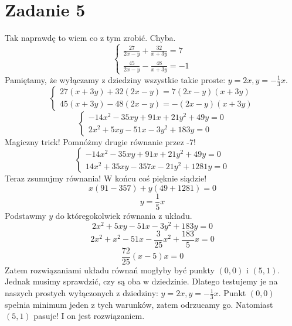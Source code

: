 \documentclass [a4paper, 10pt]{article}
\begin{document}
\section*{Zadanie 5}
Tak naprawdę to wiem co z tym zrobić. Chyba.\\
$$\begin{cases} {\frac{27}{2x-y} + \frac{32}{x+3y} = 7}\\{\frac{45}{2x-y} - \frac{48}{x+3y} = -1}\end{cases}$$
Pamiętamy, że wyłączamy z dziedziny wszystkie takie proste: $y = 2x, y = -\frac13x$.
$$\begin{cases} 27(x+3y) + 32(2x-y) = 7(2x-y)(x+3y)\\45(x+3y) - 48(2x-y) = -(2x-y)(x+3y)\end{cases}$$
$$\begin{cases} -14 x^2-35 x y+91 x+21 y^2+49 y = 0\\2x^2 + 5xy - 51x -3y^2+183y = 0\end{cases}$$
Magiczny trick! Pomnóżmy drugie równanie przez -7!
$$\begin{cases} -14 x^2-35 x y+91 x+21 y^2+49 y = 0\\14 x^2+35 x y-357 x-21 y^2+1281 y = 0\end{cases}$$
Teraz zsumujmy równania! W końcu coś pięknie siądzie!
$$x(91-357) + y(49+1281) = 0$$
$$y = \frac15x$$
Podstawmy $y$ do któregokolwiek równania z układu.
$$2x^2 + 5xy - 51x -3y^2+183y = 0$$
$$2x^2 + x^2 - 51x -\frac3{25}x^2 + \frac{183}5x = 0$$
$$\frac{72}{25}(x-5)x = 0$$
Zatem rozwiązaniami układu równań mogłyby być punkty $(0,0)$ i $(5,1)$. Jednak musimy sprawdzić, czy są oba w dziedzinie. Dlatego testujemy je na naszych prostych wyłączonych z dziedziny: $y = 2x, y = -\frac13x$. Punkt $(0,0)$ spełnia minimum jeden z tych warunków, zatem odrzucamy go. Natomiast $(5,1)$ pasuje! I on jest rozwiązaniem.
\end{document}
